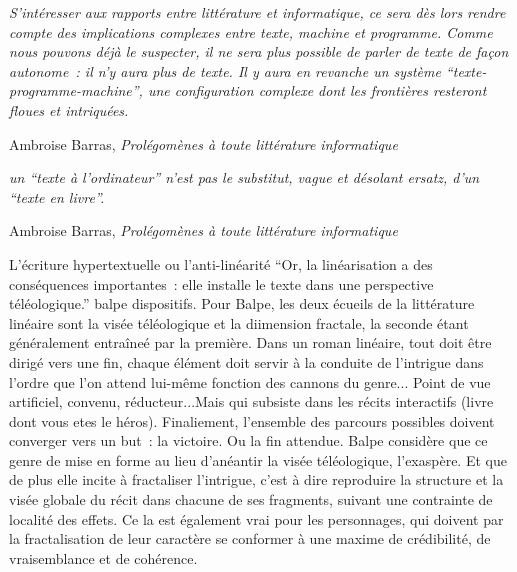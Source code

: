 \documentclass{article}
\newenvironment{citationbox}
{\begin{center}
		\begin{minipage}{.8\textwidth}
		}
		{
		\end{minipage}	
\end{center}
}
\begin{document}
				\begin{citationbox}
					\textit{S'intéresser aux rapports entre littérature et informatique, ce sera
					dès lors rendre compte des implications complexes entre texte,
					machine et programme. Comme nous pouvons déjà le suspecter, il ne sera
					plus possible de parler de texte de façon autonome~: il n'y aura plus de
					texte. Il y aura en revanche un système ``texte-programme-machine'',
					une configuration complexe dont les frontières resteront floues et
					intriquées.}
					\begin{flushright}
						Ambroise Barras, \textit{Prolégomènes à toute littérature informatique} \cite{barras1995}
					\end{flushright}
				\end{citationbox}
				\begin{citationbox}
					\textit{un ``texte à
					l'ordinateur'' n'est pas le substitut, vague et désolant ersatz, d'un ``texte en
					livre''.}
					\begin{flushright}
						Ambroise Barras, \textit{Prolégomènes à toute littérature informatique} \cite{barras1995}
					\end{flushright}
				\end{citationbox}
				
				
				
				
				
				
				
				
				
				
				
				L'écriture hypertextuelle ou l'anti-linéarité
				``Or, la linéarisation a des conséquences importantes~: elle installe le texte dans une perspective téléologique.'' balpe dispositifs. 
				Pour Balpe, les deux écueils de la littérature linéaire sont la visée téléologique et la diimension fractale, la seconde étant généralement entraîneé par la première. Dans un roman linéaire, tout doit être dirigé vers une fin, chaque élément doit servir à la conduite de l'intrigue dans l'ordre que l'on attend lui-même fonction des cannons du genre... Point de vue artificiel, convenu, réducteur...Mais qui subsiste dans les récits interactifs (livre dont vous etes le héros). Finaliement, l'ensemble des parcours possibles doivent converger vers un but : la victoire. Ou la fin attendue. Balpe considère que ce genre de mise en forme au lieu d'anéantir la visée téléologique, l'exaspère. Et que de plus elle incite à fractaliser l'intrigue, c'est à dire reproduire la structure et la visée globale du récit dans chacune de ses fragments, suivant une contrainte de localité des effets. Ce la est également vrai pour les personnages, qui doivent par la fractalisation de leur caractère se conformer à une maxime de crédibilité, de vraisemblance et de cohérence.
				
\end{document}
